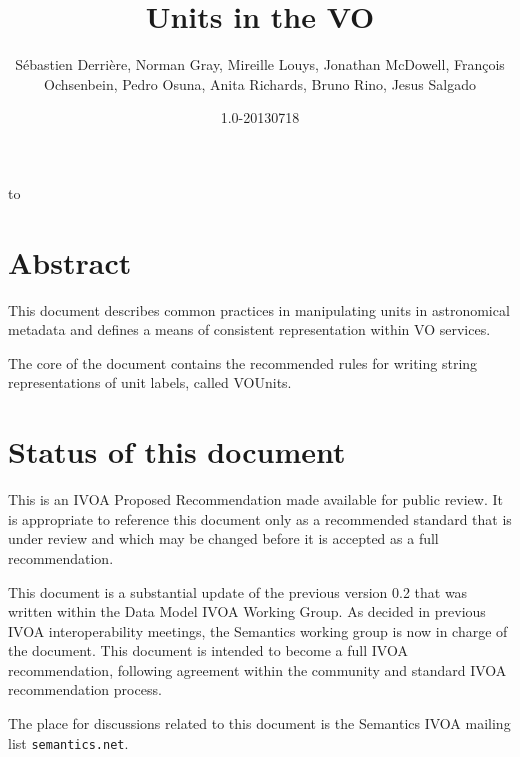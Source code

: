 \documentclass[11pt,notitlepage,onecolumn]{ivoa}
\title{Units in the VO}
\date{1.0-20130718}
\author{S\'{e}bastien Derri\`ere,
Norman Gray,
Mireille Louys,
Jonathan McDowell,
Fran\c{c}ois Ochsenbein,
Pedro Osuna,
Anita Richards,
Bruno Rino,
Jesus Salgado}
\begin{document}
\maketitle %
\thispagestyle{empty}
\begingroup
\vfill
\hbox to \textwidth{\hfil\tiny \SVNRevision, \SVNDate: \SVNHeadURL}
\endgroup
\newpage
\tableofcontents 
\newpage
\section*{Abstract}

This document describes common practices in manipulating
units in astronomical metadata and defines a means of consistent
representation within VO services.

The core of the document contains the recommended rules for writing string representations 
of unit labels, called VOUnits.

\section*{Status of this document}

This is an IVOA Proposed Recommendation made available for public review.
It is appropriate to reference this document only as a recommended standard 
that is under review and which may be changed before it is accepted as a full recommendation.


This document is a substantial update of the previous version 0.2 that
was written within the Data Model IVOA Working Group. As decided in previous
IVOA interoperability meetings, the Semantics working group is now in charge 
of the document. This document is intended to become a full IVOA recommendation,
following agreement within the community and standard IVOA recommendation process.

The place for discussions related to this document is the
Semantics IVOA mailing list {\tt semantics\@@ivoa.net}.

\end{document}
